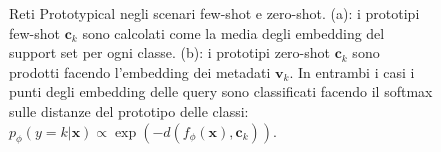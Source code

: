\documentclass[12pt,a4paper,titlepage]{article}
\begin{document}
\begin{figure}[h]
	\centering
	\qquad
	\label{fig:proto_few_zero_shot}	
	\caption{Reti Prototypical negli scenari few-shot e zero-shot. (a): i prototipi few-shot $\mathbf{c}_k$ sono calcolati come la media degli embedding del support set per ogni classe. (b): i prototipi zero-shot $\mathbf{c}_k$ sono prodotti facendo l'embedding dei metadati $\mathbf{v}_k$. In entrambi i casi i punti degli embedding delle query sono classificati facendo il softmax sulle distanze del prototipo delle classi: $p_\phi(y = k|\mathbf{x}) \propto \exp \left(-d(f_\phi(\mathbf{x}),\mathbf{c}_k) \right)$.~\cite{snell:prototypical}}
\end{figure}
\clearpage
\end{document}
